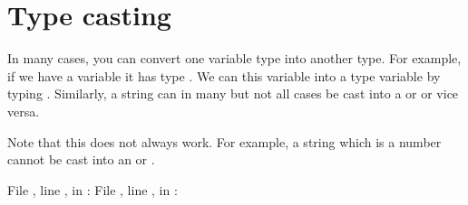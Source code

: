 \documentclass[letterpaper,10pt,english]{jupyterBook}
\begin{document}
\section{Type casting}
\label{\detokenize{notebooks/01_GettingStarted/01_GettingStarted_student:type-casting}}
\sphinxAtStartPar
In many cases, you can convert one variable type into another type. For example, if we have a variable  it has type . We can  this variable into a type  variable by typing . Similarly, a string can in many \sphinxhyphen{} but not all \sphinxhyphen{} cases be cast into a  or  or vice versa.

\begin{sphinxVerbatim}[commandchars=\\\{\}]
    
\end{sphinxVerbatim}

\sphinxAtStartPar
Note that this does not always work. For example, a string which is  a number cannot be cast into an  or .

\begin{sphinxVerbatim}[commandchars=\\\{\}]
  
  File , line , in 
: 
  File , line , in 
: 
\end{sphinxVerbatim}
\end{document}
